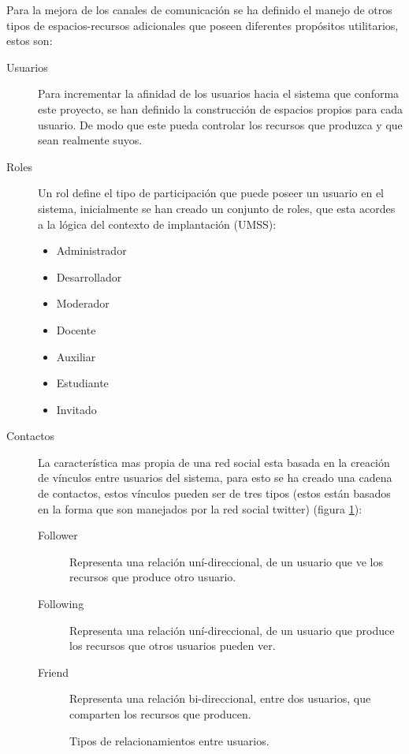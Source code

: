 Para la mejora de los canales de comunicación se ha definido el manejo de otros
tipos de espacios-recursos adicionales que poseen diferentes propósitos
utilitarios, estos son:

\begin{description}
\item [Usuarios] Para incrementar la afinidad de los usuarios hacia el sistema
que conforma este proyecto, se han definido la construcción de espacios propios
para cada usuario. De modo que este pueda controlar los recursos que produzca y
que sean realmente suyos.
\item [Roles] Un rol define el tipo de participación que puede poseer un usuario
en el sistema, inicialmente se han creado un conjunto de roles, que esta acordes
a la lógica del contexto de implantación (UMSS):
    \begin{itemize}
    \item Administrador
    \item Desarrollador
    \item Moderador
    \item Docente
    \item Auxiliar
    \item Estudiante
    \item Invitado
    \end{itemize}
\item [Contactos] La característica mas propia de una red social esta basada en
la creación de vínculos entre usuarios del sistema, para esto se ha creado una
cadena de contactos, estos vínculos pueden ser de tres tipos (estos están
basados en la forma que son manejados por la red social twitter) (figura
\ref{contactos}):
    \begin{description}
    \item [Follower] Representa una relación uní-direccional, de un usuario que
    ve los recursos que produce otro usuario.
    \item [Following] Representa una relación uní-direccional, de un usuario que
    produce los recursos que otros usuarios pueden ver.
    \item [Friend] Representa una relación bi-direccional, entre dos usuarios,
    que comparten los recursos que producen.
    \end{description}
    \begin{figure}
    \centering
    
    \caption{Tipos de relacionamientos entre usuarios.}
    \label{contactos}
    \end{figure}
\end{description}

